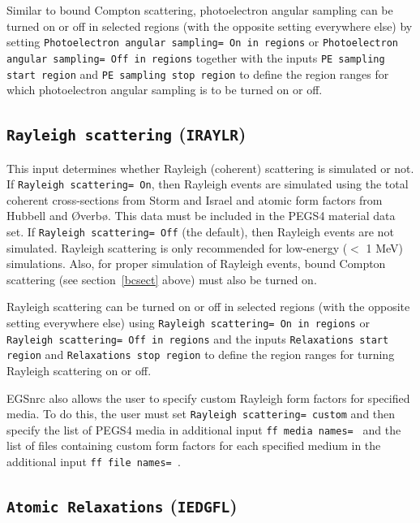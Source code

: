 \documentclass[12pt,twoside]{article}      %
\begin{document}
Similar to bound Compton scattering, photoelectron angular sampling
can be turned on or off in selected regions (with the opposite setting
everywhere else) by setting
{\tt Photoelectron angular sampling= On in regions} or
{\tt Photoelectron angular sampling= Off in regions} together with
the inputs {\tt PE sampling start region} and
{\tt PE sampling stop region} to define the region ranges for which
photoelectron angular sampling is to be turned on or off.

\subsection{{\tt Rayleigh scattering} ({\tt IRAYLR})}
\label{rayleighsect}

This input determines whether Rayleigh (coherent) scattering is
simulated or not.
If {\tt Rayleigh scattering= On}, then Rayleigh events are simulated
using the total coherent cross-sections from Storm and
Israel\cite{SI70} and atomic form factors from Hubbell and {\O}verb{\o}\cite{HO79}.
This data must be included in the PEGS4 material data set.
If {\tt Rayleigh scattering= Off} (the default), then Rayleigh
events are not simulated.  Rayleigh scattering is only recommended for
low-energy ($<$ 1 MeV) simulations.  Also, for proper simulation
of Rayleigh events, bound Compton scattering (see section~\ref{bcsect} above)
must also be turned on.

Rayleigh scattering can be turned on or off in selected regions
(with the opposite setting everywhere else) using
{\tt Rayleigh scattering= On in regions} or {\tt Rayleigh scattering= Off
in regions} and the inputs
{\tt Relaxations start region} and {\tt Relaxations stop region} to
define the region ranges for turning Rayleigh scattering on or off.

EGSnrc also allows the user to specify custom Rayleigh form factors for
specified media.  To do this, the user must
set {\tt Rayleigh scattering= custom} and then specify the list of
PEGS4 media in additional input {\tt ff media names= } and the list of
files containing custom form factors for each specified
medium in the additional input {\tt ff file names= }.

\subsection{{\tt Atomic Relaxations} ({\tt IEDGFL})}
\end{document}
